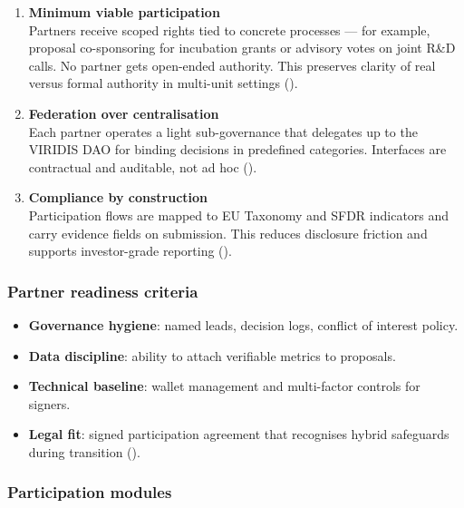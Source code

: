 \documentclass[
  english,
  12pt,
  oneside,
  open=any]{scrbook}
\providecommand{\tightlist}{%
  \setlength{\itemsep}{0pt}\setlength{\parskip}{0pt}}\usepackage{longtable,booktabs,array}
\begin{document}
\begin{enumerate}
\def\labelenumi{\arabic{enumi}.}
\tightlist
\item
  \textbf{Minimum viable participation}\\
  Partners receive scoped rights tied to concrete processes --- for
  example, proposal co-sponsoring for incubation grants or advisory
  votes on joint R\&D calls. No partner gets open-ended authority. This
  preserves clarity of real versus formal authority in multi-unit
  settings ().
\item
  \textbf{Federation over centralisation}\\
  Each partner operates a light sub-governance that delegates up to the
  VIRIDIS DAO for binding decisions in predefined categories. Interfaces
  are contractual and auditable, not ad hoc
  ().
\item
  \textbf{Compliance by construction}\\
  Participation flows are mapped to EU Taxonomy and SFDR indicators and
  carry evidence fields on submission. This reduces disclosure friction
  and supports investor-grade reporting
  ().
\end{enumerate}

\subsubsection{Partner readiness
criteria}\label{partner-readiness-criteria}

\begin{itemize}
\tightlist
\item
  \textbf{Governance hygiene}: named leads, decision logs, conflict of
  interest policy.
\item
  \textbf{Data discipline}: ability to attach verifiable metrics to
  proposals.
\item
  \textbf{Technical baseline}: wallet management and multi-factor
  controls for signers.
\item
  \textbf{Legal fit}: signed participation agreement that recognises
  hybrid safeguards during transition
  ().
\end{itemize}

\subsubsection{Participation modules}\label{participation-modules}
\end{document}
